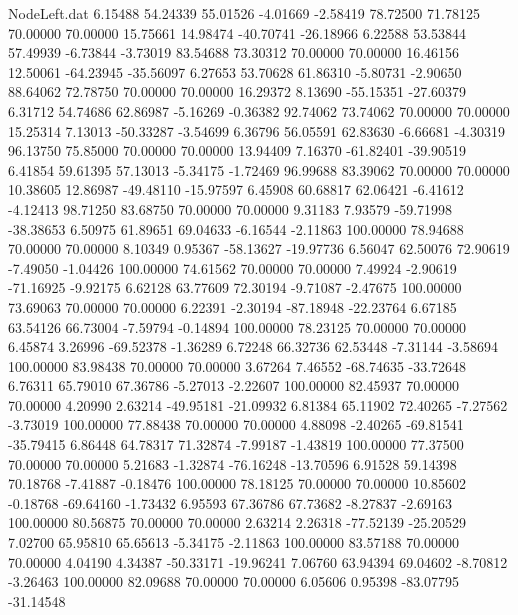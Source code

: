 \begin{filecontents}{NodeLeft.dat}
   6.15488   54.24339   55.01526    -4.01669   -2.58419   78.72500   71.78125   70.00000   70.00000   15.75661   14.98474  -40.70741  -26.18966
   6.22588   53.53844   57.49939    -6.73844   -3.73019   83.54688   73.30312   70.00000   70.00000   16.46156   12.50061  -64.23945  -35.56097
   6.27653   53.70628   61.86310    -5.80731   -2.90650   88.64062   72.78750   70.00000   70.00000   16.29372    8.13690  -55.15351  -27.60379
   6.31712   54.74686   62.86987    -5.16269   -0.36382   92.74062   73.74062   70.00000   70.00000   15.25314    7.13013  -50.33287   -3.54699
   6.36796   56.05591   62.83630    -6.66681   -4.30319   96.13750   75.85000   70.00000   70.00000   13.94409    7.16370  -61.82401  -39.90519
   6.41854   59.61395   57.13013    -5.34175   -1.72469   96.99688   83.39062   70.00000   70.00000   10.38605   12.86987  -49.48110  -15.97597
   6.45908   60.68817   62.06421    -6.41612   -4.12413   98.71250   83.68750   70.00000   70.00000    9.31183    7.93579  -59.71998  -38.38653
   6.50975   61.89651   69.04633    -6.16544   -2.11863  100.00000   78.94688   70.00000   70.00000    8.10349    0.95367  -58.13627  -19.97736
   6.56047   62.50076   72.90619    -7.49050   -1.04426  100.00000   74.61562   70.00000   70.00000    7.49924   -2.90619  -71.16925   -9.92175
   6.62128   63.77609   72.30194    -9.71087   -2.47675  100.00000   73.69063   70.00000   70.00000    6.22391   -2.30194  -87.18948  -22.23764
   6.67185   63.54126   66.73004    -7.59794   -0.14894  100.00000   78.23125   70.00000   70.00000    6.45874    3.26996  -69.52378   -1.36289
   6.72248   66.32736   62.53448    -7.31144   -3.58694  100.00000   83.98438   70.00000   70.00000    3.67264    7.46552  -68.74635  -33.72648
   6.76311   65.79010   67.36786    -5.27013   -2.22607  100.00000   82.45937   70.00000   70.00000    4.20990    2.63214  -49.95181  -21.09932
   6.81384   65.11902   72.40265    -7.27562   -3.73019  100.00000   77.88438   70.00000   70.00000    4.88098   -2.40265  -69.81541  -35.79415
   6.86448   64.78317   71.32874    -7.99187   -1.43819  100.00000   77.37500   70.00000   70.00000    5.21683   -1.32874  -76.16248  -13.70596
   6.91528   59.14398   70.18768    -7.41887   -0.18476  100.00000   78.18125   70.00000   70.00000   10.85602   -0.18768  -69.64160   -1.73432
   6.95593   67.36786   67.73682    -8.27837   -2.69163  100.00000   80.56875   70.00000   70.00000    2.63214    2.26318  -77.52139  -25.20529
   7.02700   65.95810   65.65613    -5.34175   -2.11863  100.00000   83.57188   70.00000   70.00000    4.04190    4.34387  -50.33171  -19.96241
   7.06760   63.94394   69.04602    -8.70812   -3.26463  100.00000   82.09688   70.00000   70.00000    6.05606    0.95398  -83.07795  -31.14548

\end{filecontents}

